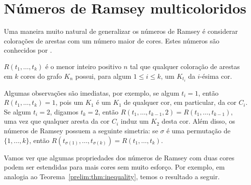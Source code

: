 
\section{Números de Ramsey multicoloridos}

Uma maneira muito natural de generalizar os números de Ramsey é considerar colorações de arestas com um número maior de cores. Estes números são conhecidos por .

\begin{definition}
$R(t_1, \dots, t_k)$ é o menor inteiro positivo $n$ tal que qualquer coloração de arestas em $k$ cores do grafo $K_n$ possui, para algum $1 \leq i \leq k$, um $K_{t_i}$ da $i$-ésima cor.
\end{definition}

Algumas observações são imediatas, por exemplo, se algum $t_i = 1$, então $R(t_1, \dots, t_k) = 1$, pois um $K_1$ é um $K_1$ de qualquer cor, em particular, da cor $C_i$. Se algum $t_i = 2$, digamos $t_k = 2$, então $R(t_1, \dots, t_{k-1}, 2) = R(t_1, \dots, t_{k-1})$, uma vez que qualquer aresta da cor $C_i$ induz um $K_2$ desta cor. Além disso, os números de Ramsey possuem a seguinte simetria: se $\sigma$ é uma permutação de $\{1, \dots, k\}$, então
$R(t_{\sigma(1)}, \dots, t_{\sigma(k)}) = R(t_1, \dots, t_k)$.

Vamos ver que algumas propriedades dos números de Ramsey com duas cores podem ser estendidas para mais cores sem muito esforço. Por exemplo, em analogia ao Teorema~\ref{prelim:thm:inequality}, temos o resultado a seguir.

